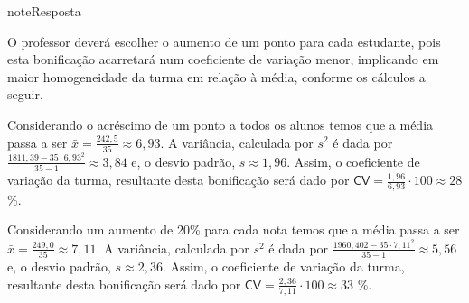 \begin{sphinxadmonition}{note}{Resposta}

O professor deverá escolher o aumento de um ponto para cada estudante, pois esta bonificação acarretará num coeficiente de variação menor, implicando em maior homogeneidade da turma em relação à média, conforme os cálculos a seguir.

Considerando o acréscimo de um ponto a todos os alunos temos que a média passa a ser \(\bar{x}=\frac{242,5}{35}\approx 6,93\).
A variância, calculada por \(s^2\) é dada por \(\frac{1811,39-35\cdot 6,93^2}{35-1}\approx 3,84\) e, o desvio padrão, \(s\approx 1,96\). Assim, o coeficiente de variação da turma, resultante desta bonificação será dado por \(\textsf{CV}=\frac{1,96}{6,93}\cdot 100\approx 28\) \%.

Considerando um aumento de 20\% para cada nota temos que a média passa a ser \(\bar{x}=\frac{249,0}{35}\approx 7,11\). A variância, calculada por \(s^2\) é dada por \(\frac{1960,402-35\cdot 7,11^2}{35-1}\approx 5,56\) e, o desvio padrão, \(s\approx 2,36\). Assim, o coeficiente de variação da turma, resultante desta bonificação será dado por \(\textsf{CV}=\frac{2,36}{7,11}\cdot 100\approx 33\) \%.
\end{sphinxadmonition}


\label{\detokenize{PE104-6::doc}}\label{\detokenize{PE104-6:explorando-boxplot}}\label{\detokenize{PE104-6:sec-explorando3}}

